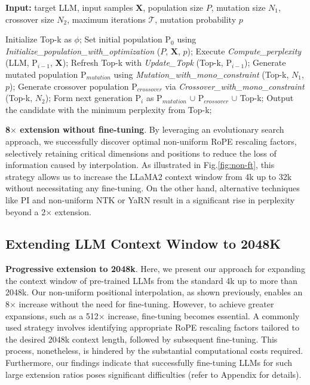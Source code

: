 \begin{algorithm}[t]
	\small
	\caption{The search algorithm}
	\textbf{Input:} target LLM, input samples $\mathbf{X}$, population size $P$, mutation size $N_1$, crossover size $N_2$, maximum iterations $\mathcal{T}$, mutation probability $p$\\

	\begin{algorithmic}[1]
		\label{alg:search}
		\STATE Initialize Top-k as $\phi$;
		\STATE Set initial population $\text{P}_0$ using \textit{Initialize\_population\_with\_optimization} ($P$, $\mathbf{X}$, $p$);
		\STATE Execute \textit{Compute\_perplexity} (LLM, $\text{P}_{i-1}$, $\mathbf{X}$);
		\STATE  Refresh Top-k with \textit{Update\_Topk} (Top-k, $\text{P}_{i-1}$);
		\STATE Generate mutated population $\text{P}_{mutation}$ using \textit{Mutation\_with\_mono\_constraint} (Top-k, $N_1$, $p$); 
		\STATE Generate crossover population $\text{P}_{crossover}$ via \textit{Crossover\_with\_mono\_constraint} (Top-k, $N_2$);
		\STATE Form next generation $\text{P}_i$ as $\text{P}_{mutation}$ $\cup$ $\text{P}_{crossover}$ $\cup$ Top-k;
		\ENDFOR
		\STATE Output the candidate with the minimum perplexity from Top-k;
	\end{algorithmic}
\end{algorithm}

\textbf{8$\times$ extension without fine-tuning}. By leveraging an evolutionary search approach, we successfully discover optimal non-uniform RoPE rescaling factors, selectively retaining critical dimensions and positions to reduce the loss of information caused by interpolation. As illustrated in Fig.\ref{fig:non-ft}, this strategy allows us to increase the LLaMA2 context window from 4k up to 32k without necessitating any fine-tuning. On the other hand, alternative techniques like PI and non-uniform NTK or YaRN result in a significant rise in perplexity beyond a 2$\times$ extension.

\subsection{Extending LLM Context Window to 2048K}
\label{sec:extendto2048k}

\textbf{Progressive extension to 2048k}. Here, we present our approach for expanding the context window of pre-trained LLMs from the standard 4k up to more than 2048k. Our non-uniform positional interpolation, as shown previously, enables an 8$\times$ increase without the need for fine-tuning. However, to achieve greater expansions, such as a 512$\times$ increase, fine-tuning becomes essential. A commonly used strategy involves identifying appropriate RoPE rescaling factors tailored to the desired 2048k context length, followed by subsequent fine-tuning. This process, nonetheless, is hindered by the substantial computational costs required. Furthermore, our findings indicate that successfully fine-tuning LLMs for such large extension ratios poses significant difficulties (refer to Appendix for details).

